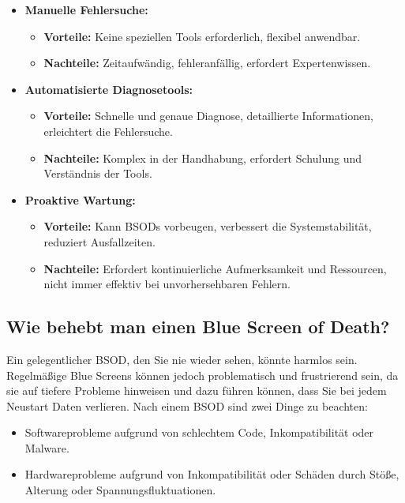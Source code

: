 \documentclass[paper=a4,fontsize=12pt,ngerman,parskip=half]{scrartcl}
\begin{document}
\begin{itemize}
  \item \textbf{Manuelle Fehlersuche:}
        \begin{itemize}
          \item \textbf{Vorteile:} Keine speziellen Tools erforderlich, flexibel anwendbar.\cite{microsoft_forum}
          \item \textbf{Nachteile:} Zeitaufwändig, fehleranfällig, erfordert Expertenwissen.\cite{avast}
        \end{itemize}
  \item \textbf{Automatisierte Diagnosetools:}
        \begin{itemize}
          \item \textbf{Vorteile:} Schnelle und genaue Diagnose, detaillierte Informationen, erleichtert die Fehlersuche.\cite{microsoft_support}
          \item \textbf{Nachteile:} Komplex in der Handhabung, erfordert Schulung und Verständnis der Tools.\cite{malwarebytes}
        \end{itemize}
  \item \textbf{Proaktive Wartung:}
        \begin{itemize}
          \item \textbf{Vorteile:} Kann BSODs vorbeugen, verbessert die Systemstabilität, reduziert Ausfallzeiten.\cite{avast}
          \item \textbf{Nachteile:} Erfordert kontinuierliche Aufmerksamkeit und Ressourcen, nicht immer effektiv bei unvorhersehbaren Fehlern.\cite{microsoft_forum}
        \end{itemize}
\end{itemize}

\subsection{Wie behebt man einen Blue Screen of Death?}

Ein gelegentlicher BSOD, den Sie nie wieder sehen, könnte harmlos sein. Regelmäßige Blue Screens können jedoch problematisch und frustrierend sein, da sie auf tiefere Probleme hinweisen und dazu führen können, dass Sie bei jedem Neustart Daten verlieren. Nach einem BSOD sind zwei Dinge zu beachten:

\begin{itemize}
  \item Softwareprobleme aufgrund von schlechtem Code, Inkompatibilität oder Malware.\cite{microsoft_support}
  \item Hardwareprobleme aufgrund von Inkompatibilität oder Schäden durch Stöße, Alterung oder Spannungsfluktuationen.\cite{avast}
\end{itemize}
\end{document}
